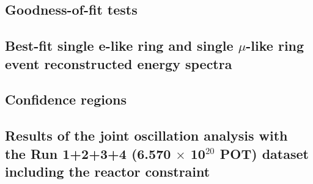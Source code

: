 

\subsection {Goodness-of-fit tests}
\label{sec:results_gof}

\subsection {Best-fit single e-like ring and single $\mu$-like ring event reconstructed energy spectra}
\label{sec:results_bestfit_spectra}

\subsection {Confidence regions}
\label{sec:results_confidence_regions}

\subsection {Results of the joint oscillation analysis with the Run 1+2+3+4 (6.570 $\times$ 10$^{20}$ POT) dataset including the reactor constraint}
\label{sec:results_reactor}



